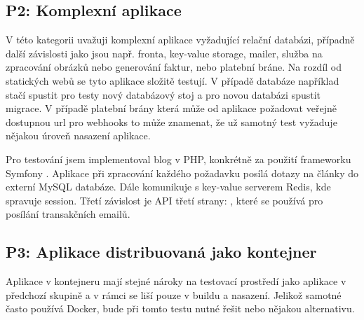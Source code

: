     \subsection{P2: Komplexní aplikace}
        V této kategorii uvažuji komplexní aplikace vyžadující relační databázi, případně další závislosti jako jsou např. fronta, key-value storage, mailer, služba na zpracování obrázků nebo generování faktur, nebo platební bráne. Na rozdíl od statických webů se tyto aplikace složitě testují. V případě databáze například stačí spustit pro testy nový databázový stoj a pro novou databázi spustit migrace. V případě platební brány která může od aplikace požadovat veřejně dostupnou url pro webhooks to může znamenat, že už samotný test vyžaduje nějakou úroveň nasazení aplikace. 

        Pro testování jsem implementoval blog v PHP, konkrétně za použití frameworku Symfony \cite{symfony}. Aplikace při zpracování každého požadavku posílá dotazy na články do externí MySQL databáze. Dále komunikuje s key-value serverem Redis, kde spravuje session. Třetí závislost je API třetí strany: , které se používá pro posílání transakčních emailů.

    \subsection{P3: Aplikace distribuovaná jako kontejner}
        Aplikace v kontejneru mají stejné nároky na testovací prostředí jako aplikace v předchozí skupině a v rámci \CICD se liší pouze v buildu a nasazení. Jelikož samotné \CI často používá Docker, bude při tomto testu nutné řešit  nebo nějakou alternativu.
